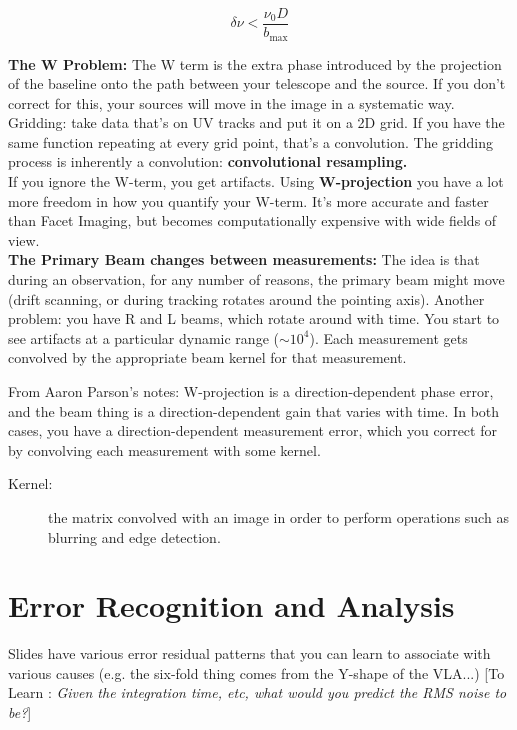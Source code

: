 \documentclass[a4paper]{article}
\newcommand{\Comment}[2]{ [{\color{red}\sc #1 :} {{\color{cyan} \it #2}}]}
\begin{document}
$$ \delta \nu < \frac{\nu_0 D}{b_\mathrm{max}} $$

\textbf{The W Problem:} The W term is the extra phase introduced by the projection of the baseline onto the path between your telescope and the source. If you don't correct for this, your sources will move in the image in a systematic way.  \\

Gridding: take data that's on UV tracks and put it on a 2D grid. If you have the same function repeating at every grid point, that's a convolution. The gridding process is inherently a convolution: \textbf{convolutional resampling.} \\

If you ignore the W-term, you get artifacts. Using \textbf{W-projection} you have a lot more freedom in how you quantify your W-term. It's more accurate and faster than Facet Imaging, but becomes computationally expensive with wide fields of view. \\

\textbf{The Primary Beam changes between measurements: } The idea is that during an observation, for any number of reasons, the primary  beam might move (drift scanning, or during tracking rotates around the pointing axis).
Another problem: you have R and L beams, which rotate around with time. You start to see artifacts at a particular dynamic range ($\sim 10^4$). Each measurement gets convolved by the appropriate beam kernel for that measurement. 

From Aaron Parson's notes: W-projection is a direction-dependent phase error, and the beam thing is a direction-dependent gain that varies with time. In both cases, you have a direction-dependent measurement error, which you correct for by convolving each measurement with some kernel. 

\begin{description}
\item[Kernel:] the matrix convolved with an image in order to perform operations such as blurring and edge detection. 
\end{description}

\section{Error Recognition and Analysis}

Slides have various error residual patterns that you can learn to associate with various causes (e.g. the six-fold thing comes from the Y-shape of the VLA...) 
\Comment{To Learn}{Given the integration time, etc, what would you predict the RMS noise to be?}
\end{document}
